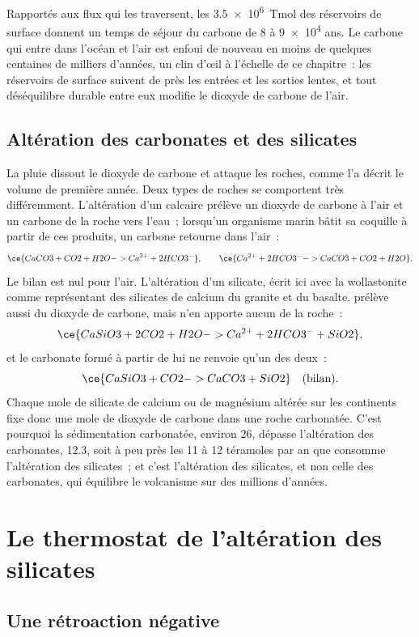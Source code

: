 Rapportés aux flux qui les traversent, les \qty{3.5e6}{Tmol} des réservoirs de surface donnent un temps de séjour
du carbone de 8 à \num{9e4} ans. Le carbone qui entre dans l'océan et l'air est enfoui de nouveau
en moins de quelques centaines de milliers d'années, un clin d'œil à l'échelle de ce chapitre~: les réservoirs
de surface suivent de près les entrées et les sorties lentes, et tout déséquilibre durable entre eux
modifie le dioxyde de carbone de l'air.

\subsection*{Altération des carbonates et des silicates}

La pluie dissout le dioxyde de carbone et attaque les roches, comme l'a décrit le volume de première année. Deux types de roches
se comportent très différemment. L'altération d'un calcaire prélève un dioxyde de carbone à l'air et un carbone
de la roche vers l'eau~; lorsqu'un organisme marin bâtit sa coquille à partir de ces produits, un carbone
retourne dans l'air~:
\[
  \ce{CaCO3 + CO2 + H2O -> Ca^{2+} + 2 HCO3^-} , \qquad
  \ce{Ca^{2+} + 2 HCO3^- -> CaCO3 + CO2 + H2O} .
\]
Le bilan est nul pour l'air. L'altération d'un silicate, écrit ici avec la wollastonite comme
représentant des silicates de calcium du granite et du basalte, prélève aussi du dioxyde de carbone, mais n'en apporte
aucun de la roche~:
\[
  \ce{CaSiO3 + 2 CO2 + H2O -> Ca^{2+} + 2 HCO3^- + SiO2} ,
\]
et le carbonate formé à partir de lui ne renvoie qu'un des deux~:
\[
  \ce{CaSiO3 + CO2 -> CaCO3 + SiO2} \quad\text{(bilan)} .
\]
Chaque mole de silicate de calcium ou de magnésium altérée sur les continents fixe donc une mole de dioxyde de
carbone dans une roche carbonatée. C'est pourquoi la sédimentation carbonatée, environ 26, dépasse l'altération des
carbonates, 12.3, soit à peu près les 11 à 12 téramoles par an que consomme l'altération des silicates~; et c'est
l'altération des silicates, et non celle des carbonates, qui équilibre le volcanisme sur des millions d'années.

\section{Le thermostat de l'altération des silicates}\label{sec:b2:deep-time-climate:thermostat}

\subsection*{Une rétroaction négative}

